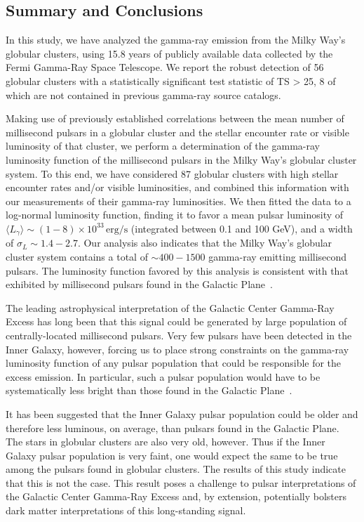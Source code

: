 \subsection{Summary and Conclusions}

In this study, we have analyzed the gamma-ray emission from the Milky Way's globular clusters, using 15.8 years of publicly available data collected by the Fermi Gamma-Ray Space Telescope. We report the robust detection of 56 globular clusters with a statistically significant test statistic of TS > 25, 8 of which are not contained in previous gamma-ray source catalogs. 

Making use of previously established correlations between the mean number of millisecond pulsars in a globular cluster and the stellar encounter rate or visible luminosity of that cluster, we perform a determination of the gamma-ray luminosity function of the millisecond pulsars in the Milky Way's globular cluster system. To this end, we have considered 87 globular clusters with high stellar encounter rates and/or visible luminosities, and combined this information with our measurements of their gamma-ray luminosities. We then fitted the data to a log-normal luminosity function, finding it to favor a mean pulsar luminosity of $\langle L_{\gamma}\rangle \sim (1-8)\times 10^{33}\, \textrm{erg/s}$ (integrated between 0.1 and 100 GeV), and a width of $\sigma_L \sim 1.4-2.7$. Our analysis also indicates that the Milky Way's globular cluster system contains a total of $\sim 400-1500$ gamma-ray emitting millisecond pulsars. The luminosity function favored by this analysis is consistent with that exhibited by millisecond pulsars found in the Galactic Plane~\cite{Holst:2024fvb}.  

The leading astrophysical interpretation of the Galactic Center Gamma-Ray Excess has long been that this signal could be generated by large population of centrally-located millisecond pulsars. Very few pulsars have been detected in the Inner Galaxy, however, forcing us to place strong constraints on the gamma-ray luminosity function of any pulsar population that could be responsible for the excess emission. In particular, such a pulsar population would have to be systematically less bright than those found in the Galactic Plane~\cite{Holst:2024fvb}. 

It has been suggested that the Inner Galaxy pulsar population could be older and therefore less luminous, on average, than pulsars found in the Galactic Plane. The stars in globular clusters are also very old, however. Thus if the Inner Galaxy pulsar population is very faint, one would expect the same to be true among the pulsars found in globular clusters. The results of this study indicate that this is not the case. This result poses a challenge to pulsar interpretations of the Galactic Center Gamma-Ray Excess and, by extension, potentially bolsters dark matter interpretations of this long-standing signal. 

\bigskip



